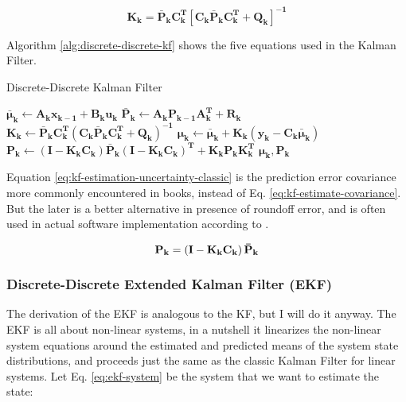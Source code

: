 \documentclass[12pt]{article}
\newcommand{\bvec}[1]{\mathbf{#1}} %
\newcommand{\mat}[1]{\mathbf{#1}}
\newcommand{\matT}[1]{\mathbf{#1^T}}
\newcommand{\brac}[1]{\left[#1\right]} %
\newcommand{\parentheses}[1]{\left(#1\right)}
\newcommand{\mb}[1]{{\boldsymbol{#1}}} %
\begin{document}
\begin{equation}
    \mat{K_k} = \mat{\bar{P}_k}\matT{C_k} \brac{\mat{C_k}\mat{\bar{P}_k}\matT{C_k} + \mat{Q_k}}^\mathbf{-1}
    \label{eq:kf-gain}
\end{equation}

Algorithm \ref{alg:discrete-discrete-kf} shows the five equations used in the Kalman Filter.
\begin{algorithm}[h]
\caption{Discrete-Discrete Kalman Filter}
\label{alg:discrete-discrete-kf}
\begin{algorithmic}[1]
\Procedure{Kalman Filter}{$\mb{\mu}_\mathbf{k-1}, \mat{P_{k-1}}, \bvec{u_k}, \bvec{y_k}$}
\State $\mb{\bar{\mu}}_\mathbf{k} \gets \mat{A_k}\bvec{x_{k-1}} + \mat{B_k}\bvec{u_k}$ 
\State $\mat{\bar{P}_k} \gets \mat{A_k P_{k-1} A^T_k + R_k}$ 
\State $\mat{K_k} \gets \mat{\bar{P}_k C^T_k \parentheses{C_k \bar{P}_k C^T_k + Q_k}^{-1}}$ 
\State $\mb{\mu}_\mathbf{k} \gets \mb{\bar{\mu}}_\mathbf{k} + \mat{K_k} \parentheses{\bvec{y_k} - \mat{C_k}\mb{\bar{\mu}}_\mathbf{k}}$ 
\State $\mat{P_k} \gets \parentheses{\mat{I} - \mat{K_k C_k}}\mat{\bar{P}_k} \parentheses{\mat{I} - \mat{K_k C_k}}^\mathbf{T} + \mat{K_k P_k K_k^T}$ 
\State \Return $\mb{\mu}_\mathbf{k}, \mat{P_k}$
\EndProcedure
\end{algorithmic}
\end{algorithm}

Equation \ref{eq:kf-estimation-uncertainty-classic} is the prediction error covariance more commonly encountered in books, instead of Eq. \ref{eq:kf-estimate-covariance}. But the later is a better alternative in presence of roundoff error, and is often used in actual software implementation according to \cite[p.~ 73]{lewis2017optimal}.

\begin{equation}
    \mat{P_k} = \parentheses{\mat{I} - \mat{K_k C_k}}\mat{\Bar{P}_k}
    \label{eq:kf-estimation-uncertainty-classic}
\end{equation}

\subsubsection{Discrete-Discrete Extended Kalman Filter (EKF)}
The derivation of the EKF is analogous to the KF, but I will do it anyway. The EKF is all about non-linear systems, in a nutshell it linearizes the non-linear system equations around the estimated and predicted means of the system state distributions, and proceeds just the same as the classic Kalman Filter for linear systems.
Let Eq. \ref{eq:ekf-system} be the system that we want to estimate the state:
\end{document}
